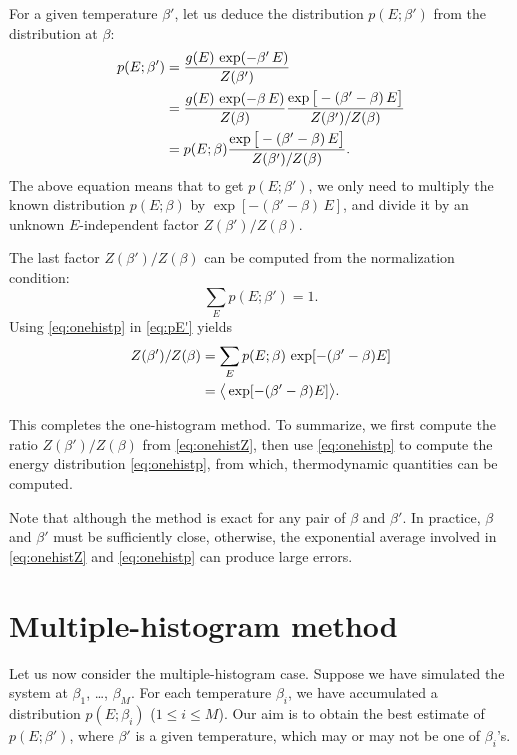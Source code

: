 \documentclass[12pt]{article}
\begin{document}
For a given temperature $\beta'$,
let us deduce the distribution $p(E; \beta')$
from the distribution at $\beta$:
\begin{align}
  p(E; \beta')
&=
\frac{ g(E) \, \exp(-\beta' \, E) }
     { Z(\beta') }
\notag \\
&=
\frac{ g(E) \, \exp(-\beta \, E) }
     { Z(\beta) }
\frac{ \exp\big[ -(\beta' - \beta) \, E \big] }
     { Z(\beta') / Z(\beta) }
\notag \\
&=
p(E; \beta)
\frac{ \exp\big[ -(\beta' - \beta) \, E \big] }
     { Z(\beta') / Z(\beta) }.
\label{eq:onehistp}
\end{align}
The above equation means that to get $p(E; \beta')$,
we only need to multiply the known distribution $p(E; \beta)$
by $\exp[ -(\beta' - \beta) \, E ]$,
and divide it by an unknown $E$-independent factor $Z(\beta')/Z(\beta)$.


The last factor $Z(\beta')/Z(\beta)$ can be computed
from the normalization condition:
\begin{equation}
  \sum_E p(E; \beta') = 1.
  \label{eq:pE'}
\end{equation}
Using \eqref{eq:onehistp} in \eqref{eq:pE'} yields
\begin{align}
  Z(\beta')/Z(\beta)
&=
  \sum_E p(E; \beta) \, \exp[-(\beta' - \beta) E]
  \notag \\
&=
  \big\langle \exp[-(\beta' - \beta) E] \big\rangle.
\label{eq:onehistZ}
\end{align}

This completes the one-histogram method.
To summarize,
we first compute the ratio $Z(\beta')/Z(\beta)$ from \eqref{eq:onehistZ},
then use \eqref{eq:onehistp} to compute
the energy distribution \eqref{eq:onehistp},
from which, thermodynamic quantities can be computed.

Note that although the method is exact for any pair of $\beta$ and $\beta'$.
%
In practice, $\beta$ and $\beta'$ must be sufficiently close,
otherwise, the exponential average involved in
\eqref{eq:onehistZ} and \eqref{eq:onehistp} can produce large errors.




\section{Multiple-histogram method}

Let us now consider the multiple-histogram case.
%
Suppose we have simulated the system at $\beta_1$, \dots, $\beta_M$.
%
For each temperature $\beta_i$,
we have accumulated a distribution $p(E; \beta_i)$
($1 \le i \le M$).
%
Our aim is to obtain the best estimate of $p(E; \beta')$,
where $\beta'$ is a given temperature,
which may or may not be one of $\beta_i$'s.
\end{document}
